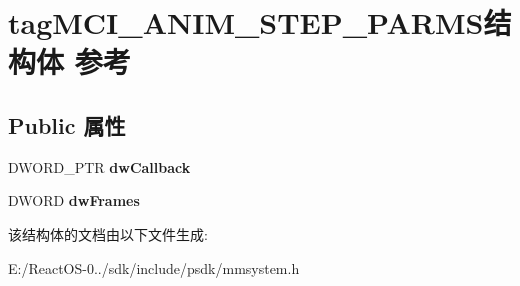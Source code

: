 \hypertarget{structtag_m_c_i___a_n_i_m___s_t_e_p___p_a_r_m_s}{}\section{tag\+M\+C\+I\+\_\+\+A\+N\+I\+M\+\_\+\+S\+T\+E\+P\+\_\+\+P\+A\+R\+M\+S结构体 参考}
\label{structtag_m_c_i___a_n_i_m___s_t_e_p___p_a_r_m_s}
\subsection*{Public 属性}
\begin{DoxyCompactItemize}
\item 
\mbox{\label{structtag_m_c_i___a_n_i_m___s_t_e_p___p_a_r_m_s_a538057fe92081fdcebfb39d0532cdccd}} 
D\+W\+O\+R\+D\+\_\+\+P\+TR {\bfseries dw\+Callback}
\item 
\mbox{\label{structtag_m_c_i___a_n_i_m___s_t_e_p___p_a_r_m_s_a9f19c2cc533a8253efd7d478e381eabd}} 
D\+W\+O\+RD {\bfseries dw\+Frames}
\end{DoxyCompactItemize}


该结构体的文档由以下文件生成\+:\begin{DoxyCompactItemize}
\item 
E\+:/\+React\+O\+S-\/0../sdk/include/psdk/mmsystem.\+h\end{DoxyCompactItemize}
